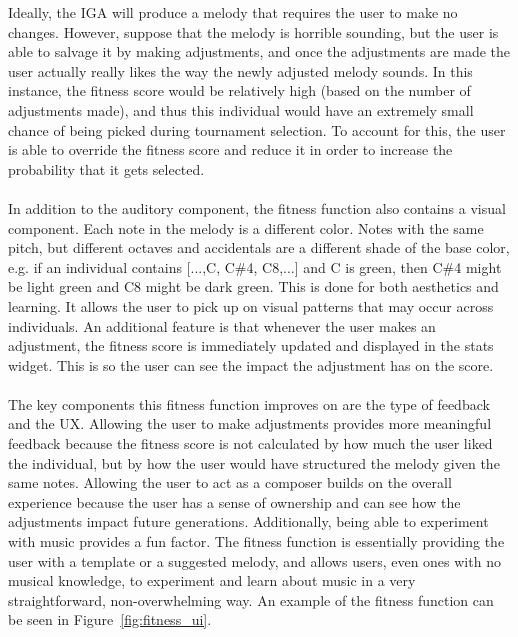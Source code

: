 \documentclass[12pt]{article} %
\begin{document}
Ideally, the IGA will produce a melody that requires the user to make no changes. However, suppose that the melody is horrible sounding, but the user is able to salvage it by making adjustments, and once the adjustments are made the user actually really likes the way the newly adjusted melody sounds. In this instance, the fitness score would be relatively high (based on the number of adjustments made), and thus this individual would have an extremely small chance of being picked during tournament selection. To account for this, the user is able to override the fitness score and reduce it in order to increase the probability that it gets selected. \\
\\
In addition to the auditory component, the fitness function also contains a visual component. Each note in the melody is a different color. Notes with the same pitch, but different octaves and accidentals are a different shade of the base color, e.g. if an individual contains [...,C, C\#4, C8,...] and C is green, then C\#4 might be light green and C8 might be dark green. This is done for both aesthetics and learning. It allows the user to pick up on visual patterns that may occur across individuals. An additional feature is that whenever the user makes an adjustment, the fitness score is immediately updated and displayed in the stats widget. This is so the user can see the impact the adjustment has on the score.\\
\\
The key components this fitness function improves on are the type of feedback and the UX. Allowing the user to make adjustments provides more meaningful feedback because the fitness score is not calculated by how much the user liked the individual, but by how the user would have structured the melody given the same notes. Allowing the user to act as a composer builds on the overall experience because the user has a sense of ownership and can see how the adjustments impact future generations. Additionally, being able to experiment with music provides a fun factor. The fitness function is essentially providing the user with a template or a suggested melody, and allows users, even ones with no musical knowledge, to experiment and learn about music in a very straightforward, non-overwhelming way. An example of the fitness function can be seen in Figure~\ref{fig:fitness_ui}.
\end{document}
